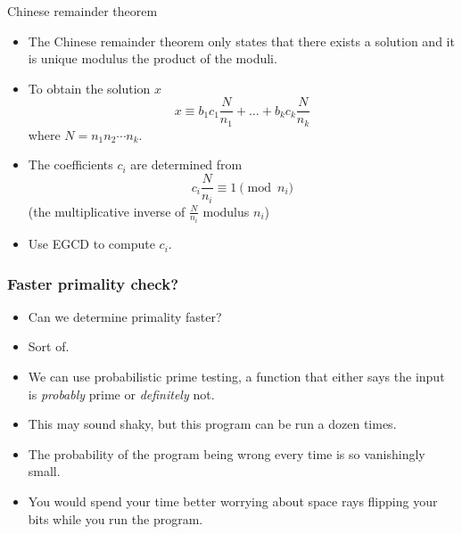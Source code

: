 \documentclass{beamer}
\begin{document}
\begin{frame}[plain]{Chinese remainder theorem}
  \vspace{10pt}
  \begin{itemize}
    \item The Chinese remainder theorem only states that there exists a solution and it
  is unique modulus the product of the moduli. \\
    \item To obtain the solution $x$
      \[
        x \equiv b_1 c_1 \frac{N}{n_1} + \ldots + b_k c_k \frac{N}{n_k}
      \]
      where $N = n_1 n_2 \cdots n_k$.
    \item The coefficients $c_i$ are determined from
      \[
        c_i \frac{N}{n_i} \equiv 1 \pmod{n_i}
      \]
      (the multiplicative inverse of $\frac{N}{n_i}$ modulus $n_i$)
    \item Use EGCD to compute $c_i$.
  \end{itemize}
\end{frame}



\begin{frame}[plain]
\frametitle{Faster primality check?}

\begin{itemize}
    \item<1-> Can we determine primality faster?
    \item<2-> Sort of.
    \item<3-> We can use probabilistic prime testing, a function that either says the input is \textit{probably} prime or \textit{definitely} not.
    \item<4-> This may sound shaky, but this program can be run a dozen times.
    \item<5-> The probability of the program being wrong every time is so vanishingly small.
    \item<6-> You would spend your time better worrying about space rays flipping your bits while you run the program.
\end{itemize}

\end{frame}
\end{document}
